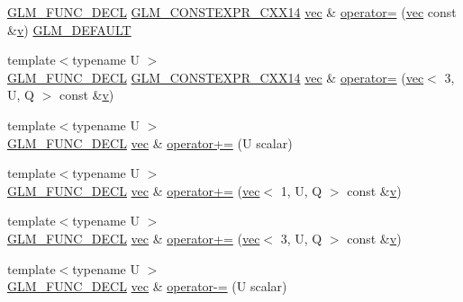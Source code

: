 \begin{DoxyCompactItemize}
\hyperlink{setup_8hpp_ab2d052de21a70539923e9bcbf6e83a51}{G\+L\+M\+\_\+\+F\+U\+N\+C\+\_\+\+D\+E\+CL} \hyperlink{setup_8hpp_a4dd12abf5e1164bc57f3a34671d03844}{G\+L\+M\+\_\+\+C\+O\+N\+S\+T\+E\+X\+P\+R\+\_\+\+C\+X\+X14} \hyperlink{structglm_1_1vec}{vec} \& \hyperlink{structglm_1_1vec_3_013_00_01_t_00_01_q_01_4_ab955dba2c50085c9e1b3f6b0daa36fcc}{operator=} (\hyperlink{structglm_1_1vec}{vec} const \&\hyperlink{_s_d_l__opengl_8h_a10a82eabcb59d2fcd74acee063775f90}{v}) \hyperlink{setup_8hpp_aefce7051c376a64ba89fa93a9f63bc2c}{G\+L\+M\+\_\+\+D\+E\+F\+A\+U\+LT}
\item 
{\footnotesize template$<$typename U $>$ }\\\hyperlink{setup_8hpp_ab2d052de21a70539923e9bcbf6e83a51}{G\+L\+M\+\_\+\+F\+U\+N\+C\+\_\+\+D\+E\+CL} \hyperlink{setup_8hpp_a4dd12abf5e1164bc57f3a34671d03844}{G\+L\+M\+\_\+\+C\+O\+N\+S\+T\+E\+X\+P\+R\+\_\+\+C\+X\+X14} \hyperlink{structglm_1_1vec}{vec} \& \hyperlink{structglm_1_1vec_3_013_00_01_t_00_01_q_01_4_a10cb43cfab9dbc66022f9bd5c121b694}{operator=} (\hyperlink{structglm_1_1vec}{vec}$<$ 3, U, Q $>$ const \&\hyperlink{_s_d_l__opengl_8h_a10a82eabcb59d2fcd74acee063775f90}{v})
\item 
{\footnotesize template$<$typename U $>$ }\\\hyperlink{setup_8hpp_ab2d052de21a70539923e9bcbf6e83a51}{G\+L\+M\+\_\+\+F\+U\+N\+C\+\_\+\+D\+E\+CL} \hyperlink{structglm_1_1vec}{vec} \& \hyperlink{structglm_1_1vec_3_013_00_01_t_00_01_q_01_4_a342066932ae10cf28589b8cd845edb7c}{operator+=} (U scalar)
\item 
{\footnotesize template$<$typename U $>$ }\\\hyperlink{setup_8hpp_ab2d052de21a70539923e9bcbf6e83a51}{G\+L\+M\+\_\+\+F\+U\+N\+C\+\_\+\+D\+E\+CL} \hyperlink{structglm_1_1vec}{vec} \& \hyperlink{structglm_1_1vec_3_013_00_01_t_00_01_q_01_4_a63f2591742e886ac84b03e2ad7157b2f}{operator+=} (\hyperlink{structglm_1_1vec}{vec}$<$ 1, U, Q $>$ const \&\hyperlink{_s_d_l__opengl_8h_a10a82eabcb59d2fcd74acee063775f90}{v})
\item 
{\footnotesize template$<$typename U $>$ }\\\hyperlink{setup_8hpp_ab2d052de21a70539923e9bcbf6e83a51}{G\+L\+M\+\_\+\+F\+U\+N\+C\+\_\+\+D\+E\+CL} \hyperlink{structglm_1_1vec}{vec} \& \hyperlink{structglm_1_1vec_3_013_00_01_t_00_01_q_01_4_af225b4b2d835609198480cd692c088d8}{operator+=} (\hyperlink{structglm_1_1vec}{vec}$<$ 3, U, Q $>$ const \&\hyperlink{_s_d_l__opengl_8h_a10a82eabcb59d2fcd74acee063775f90}{v})
\item 
{\footnotesize template$<$typename U $>$ }\\\hyperlink{setup_8hpp_ab2d052de21a70539923e9bcbf6e83a51}{G\+L\+M\+\_\+\+F\+U\+N\+C\+\_\+\+D\+E\+CL} \hyperlink{structglm_1_1vec}{vec} \& \hyperlink{structglm_1_1vec_3_013_00_01_t_00_01_q_01_4_a095c0fe97fff65c3ef77bdb0c41a747f}{operator-\/=} (U scalar)

\end{DoxyCompactItemize}
